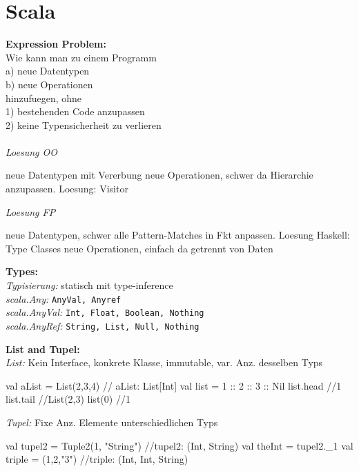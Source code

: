 
\section{Scala}

\begin{breakbox}
\textbf{Expression Problem:}\\
Wie kann man zu einem Programm \\
a) neue Datentypen \\
b) neue Operationen \\
hinzufuegen, ohne\\
1) bestehenden Code anzupassen\\
2) keine Typensicherheit zu verlieren \\\\
\emph{Loesung OO}
\begin{itemize}
	\pro neue Datentypen mit Vererbung
	\con neue Operationen, schwer da Hierarchie anzupassen. Loesung: Visitor
\end{itemize}
\emph{Loesung FP}
\begin{itemize}
	\con neue Datentypen, schwer alle Pattern-Matches in Fkt anpassen. Loesung Haskell: Type Classes
	\pro neue Operationen, einfach da getrennt von Daten
\end{itemize}
\end{breakbox}

\begin{breakbox}
\textbf{Types:}\\
\emph{Typisierung:} statisch mit type-inference\\
\emph{scala.Any:} \texttt{AnyVal, Anyref}\\
\emph{scala.AnyVal:} \texttt{Int, Float, Boolean, Nothing}\\
\emph{scala.AnyRef:} \texttt{String, List, Null, Nothing}\\
\end{breakbox}

\begin{breakbox}
\textbf{List and Tupel:}\\
\emph{List:} Kein Interface, konkrete Klasse, immutable, var. Anz. desselben Typs\\
\begin{scalacode}
val aList = List(2,3,4) // aList: List[Int]
val list = 1 :: 2 :: 3 :: Nil
list.head //1
list.tail //List(2,3)
list(0) //1
\end{scalacode}

\emph{Tupel:} Fixe Anz. Elemente unterschiedlichen Typs\\
\begin{scalacode}
val tupel2 = Tuple2(1, "String") //tupel2: (Int, String)
val theInt = tupel2._1
val triple = (1,2,"3") //triple: (Int, Int, String)
\end{scalacode}
\end{breakbox}

